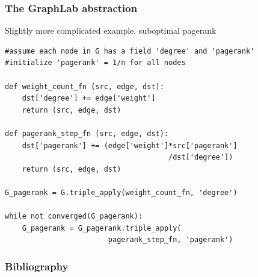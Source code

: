 \documentclass{beamer}
\newcommand{\fdmfamily}{\ttfamily}
\begin{document}
\begin{frame}[t, fragile]
\frametitle{\bf The GraphLab abstraction}
\begin{center}
\vspace{-1\baselineskip}
Slightly more complicated example, suboptimal pagerank
\vspace{-0.5\baselineskip}
\end{center}
\begin{lstlisting}[basicstyle=\fdmfamily\scriptsize]
#assume each node in G has a field 'degree' and 'pagerank'
#initialize 'pagerank' = 1/n for all nodes

def weight_count_fn (src, edge, dst):
    dst['degree'] += edge['weight']
    return (src, edge, dst)

def pagerank_step_fn (src, edge, dst):
    dst['pagerank'] += (edge['weight']*src['pagerank']
                                      /dst['degree'])
    return (src, edge, dst)

G_pagerank = G.triple_apply(weight_count_fn, 'degree')

while not converged(G_pagerank):
    G_pagerank = G_pagerank.triple_apply(
                        pagerank_step_fn, 'pagerank')
\end{lstlisting}
\pause

\begin{center}
\vspace{-1.5\baselineskip}
\end{center}
\end{frame}


\begin{frame}[allowframebreaks]
\frametitle{Bibliography}
\nocite{low2010graphlab:}
\printbibliography
\end{frame}




\MakeLastSlide
\end{document}
